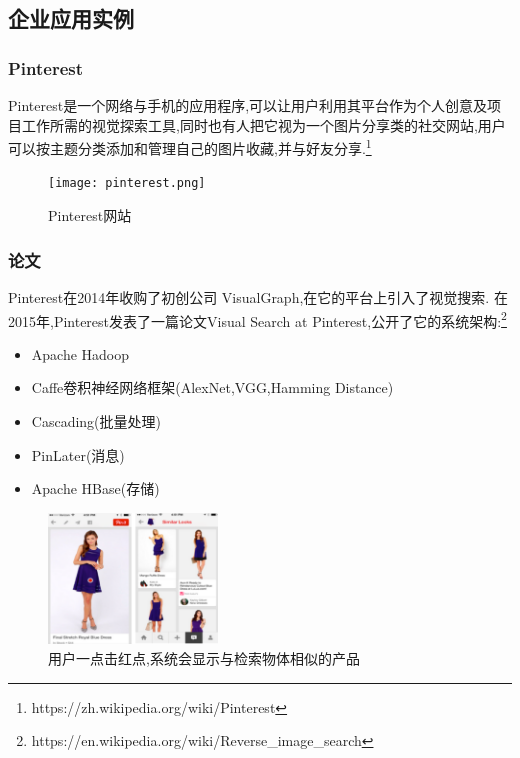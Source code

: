 \documentclass[table]{beamer}
\begin{document}
\subsection{企业应用实例}
\begin{frame}
	\frametitle{Pinterest}
	\tiny{Pinterest是一个网络与手机的应用程序,可以让用户利用其平台作为个人创意及项目工作所需的视觉探索工具,同时也有人把它视为一个图片分享类的社交网站,用户可以按主题分类添加和管理自己的图片收藏,并与好友分享.}\footnote{https://zh.wikipedia.org/wiki/Pinterest}
	\begin{figure}
		\texttt{[image: pinterest.png]}
		\caption{Pinterest网站}
		\label{fig:pinterest}
	\end{figure}
\end{frame}
\begin{frame}
	\frametitle{论文}
	\tiny{Pinterest在2014年收购了初创公司 VisualGraph,在它的平台上引入了视觉搜索. 在2015年,Pinterest发表了一篇论文Visual Search at Pinterest\autocite{jing2015visual},公开了它的系统架构:\footnote{https://en.wikipedia.org/wiki/Reverse\_image\_search}}
	\begin{itemize}
		\item Apache Hadoop
		\item Caffe卷积神经网络框架(AlexNet,VGG,Hamming Distance)
		\item Cascading(批量处理)
		\item PinLater(消息)
		\item Apache HBase(存储)
	\end{itemize}
	\begin{figure}
		\includegraphics[width=0.4\textwidth]{Pinterest-Similar-Looks.png}
		\caption{用户一点击红点,系统会显示与检索物体相似的产品}
		\label{}
	\end{figure}
\end{frame}
\end{document}
